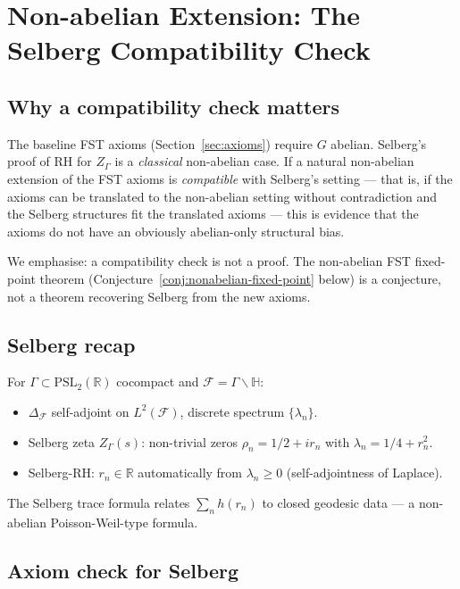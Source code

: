 \documentclass[11pt,a4paper]{article}
\theoremstyle{plain}
\theoremstyle{definition}
\newcommand{\R}{\mathbb{R}}
\begin{document}
\section{Non-abelian Extension: The Selberg Compatibility Check}
\label{sec:selberg}

\subsection{Why a compatibility check matters}

The baseline FST axioms (Section~\ref{sec:axioms}) require $G$
abelian.  Selberg's proof of RH for $Z_\Gamma$ is a
\emph{classical} non-abelian case.  If a natural non-abelian
extension of the FST axioms is \emph{compatible} with Selberg's
setting --- that is, if the axioms can be translated to the
non-abelian setting without contradiction and the Selberg structures
fit the translated axioms --- this is evidence that the axioms do
not have an obviously abelian-only structural bias.

We emphasise: a compatibility check is not a proof.  The non-abelian
FST fixed-point theorem (Conjecture~\ref{conj:nonabelian-fixed-point}
below) is a conjecture, not a theorem recovering Selberg from the
new axioms.

\subsection{Selberg recap}

For $\Gamma \subset \mathrm{PSL}_2(\R)$ cocompact and
$\mathcal F = \Gamma \backslash \mathbb H$:
\begin{itemize}
\item $\Delta_{\mathcal F}$ self-adjoint on $L^2(\mathcal F)$,
  discrete spectrum $\{\lambda_n\}$.
\item Selberg zeta $Z_\Gamma(s)$: non-trivial zeros
  $\rho_n = 1/2 + i r_n$ with $\lambda_n = 1/4 + r_n^2$.
\item Selberg-RH: $r_n \in \R$ automatically from
  $\lambda_n \geq 0$ (self-adjointness of Laplace).
\end{itemize}

The Selberg trace formula relates $\sum_n h(r_n)$ to closed
geodesic data --- a non-abelian Poisson-Weil-type formula.

\subsection{Axiom check for Selberg}
\end{document}
